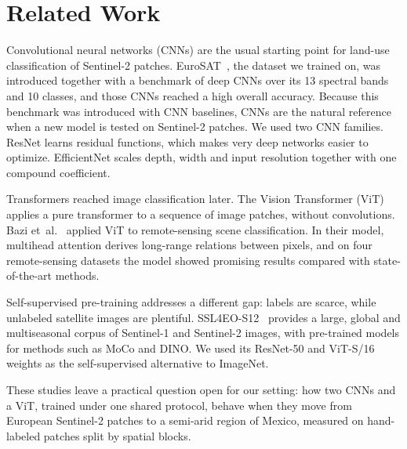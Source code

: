 \section{Related Work}\label{sec:related}

Convolutional neural networks (CNNs) are the usual starting point for land-use classification of
Sentinel-2 patches. EuroSAT~\cite{helber2019eurosat}, the dataset we trained on, was introduced
together with a benchmark of deep CNNs over its 13 spectral bands and 10 classes, and those CNNs
reached a high overall accuracy. Because this
benchmark was introduced with CNN baselines, CNNs are the natural reference when a new model is
tested on Sentinel-2 patches. We used two CNN families. ResNet learns residual
functions, which makes very deep networks easier to optimize. EfficientNet
scales depth, width and input resolution together with one compound coefficient.

Transformers reached image classification later. The Vision Transformer
(ViT) applies a pure transformer to a sequence of image patches,
without convolutions. Bazi
et~al.~\cite{bazi2021vit} applied ViT to remote-sensing scene classification. In their model,
multihead attention derives long-range relations between pixels, and on four remote-sensing
datasets the model showed promising results compared with state-of-the-art methods.

Self-supervised pre-training addresses a different gap: labels are scarce, while unlabeled
satellite images are plentiful. SSL4EO-S12~\cite{wang2023ssl4eo} provides a
large, global and multiseasonal corpus of Sentinel-1 and Sentinel-2 images, with pre-trained
models for methods such as MoCo and DINO. We used its ResNet-50 and ViT-S/16 weights as the
self-supervised alternative to ImageNet.

These studies leave a practical question open for our setting: how two CNNs and a ViT,
trained under one shared protocol, behave when they move from European Sentinel-2 patches to a
semi-arid region of Mexico, measured on hand-labeled patches split by spatial blocks.
